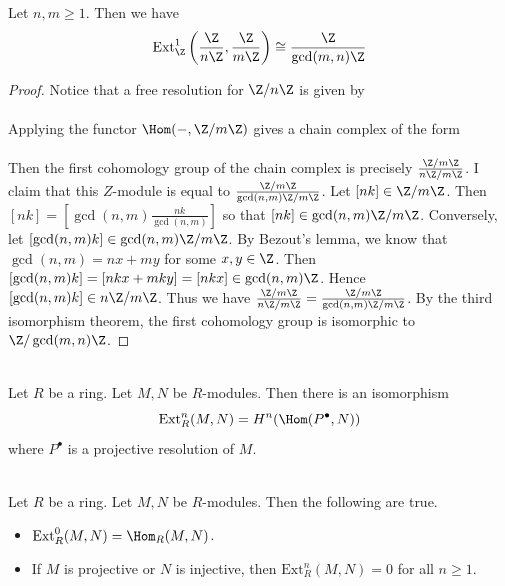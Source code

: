 \documentclass[a4paper]{article}
\begin{document}
\begin{eg}{}{} Let $n,m\geq 1$. Then we have $$\text{Ext}_\Z^1\left(\frac{\Z}{n\Z},\frac{\Z}{m\Z}\right)\cong\frac{\Z}{\gcd(m,n)\Z}$$ 
\begin{proof}
Notice that a free resolution for $\Z/n\Z$ is given by \\
 \\
Applying the functor $\Hom(-,\Z/m\Z)$ gives a chain complex of the form \\
 \\
Then the first cohomology group of the chain complex is precisely $\frac{\Z/m\Z}{n\Z/m\Z}$. I claim that this $Z$-module is equal to $\frac{\Z/m\Z}{\gcd(n,m)\Z/m\Z}$. Let $[nk]\in\Z/m\Z$. Then $[nk]=\left[\gcd(n,m)\frac{nk}{\gcd(n,m)}\right]$ so that $[nk]\in\gcd(n,m)\Z/m\Z$. Conversely, let $[\gcd(n,m)k]\in\gcd(n,m)\Z/m\Z$. By Bezout's lemma, we know that $\gcd(n,m)=nx+my$ for some $x,y\in\Z$. Then $[\gcd(n,m)k]=[nkx+mky]=[nkx]\in\gcd(n,m)\Z$. Hence $[\gcd(n,m)k]\in n\Z/m\Z$. Thus we have $\frac{\Z/m\Z}{n\Z/m\Z}=\frac{\Z/m\Z}{\gcd(n,m)\Z/m\Z}$. By the third isomorphism theorem, the first cohomology group is isomorphic to $\Z/\gcd(m,n)\Z$. 
\end{proof}
\end{eg}

\begin{prp}{}{}\\
Let $R$ be a ring. Let $M,N$ be $R$-modules. Then there is an isomorphism $$\text{Ext}_R^n(M,N)=H^n(\Hom(P^\bullet,N))$$ where $P^\bullet$ is a projective resolution of $M$. 
\end{prp}

\begin{prp}{}{}\\
Let $R$ be a ring. Let $M,N$ be $R$-modules. Then the following are true. 
\begin{itemize}
\item $\text{Ext}_R^0(M,N)=\Hom_R(M,N)$. 
\item If $M$ is projective or $N$ is injective, then $\text{Ext}_R^n(M,N)=0$ for all $n\geq 1$. 
\end{itemize}
\end{prp}
\end{document}
